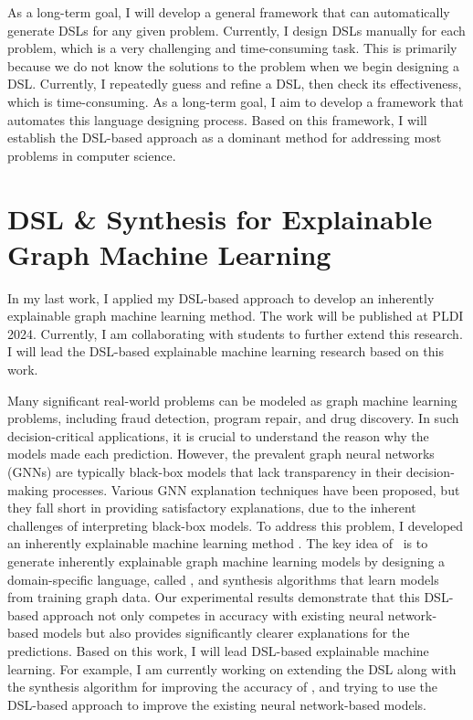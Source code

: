 \documentclass[11pt]{article}
\newcommand{\myparagraph}[1]{\medskip\noindent{\it \textbf{#1.}}}
\begin{document}
As a long-term goal, I will develop a general framework that can automatically generate DSLs for any given problem. 
%
Currently, I design DSLs manually for each problem, which is a very challenging and time-consuming task. 
%
This is primarily because we do not know the solutions to the problem when we begin designing a DSL.
%
Currently, I repeatedly guess and refine a DSL, then check its effectiveness, which is time-consuming.
%
As a long-term goal, I aim to develop a framework that automates this language designing process.
%
Based on this framework, I will establish the DSL-based approach as a dominant method for addressing most problems in computer science.



\section{DSL \& Synthesis for Explainable Graph Machine Learning}
%
In my last work, I applied my DSL-based approach to develop an inherently explainable graph machine learning method. 
%
The work will be published at PLDI 2024. 
%
Currently, I am collaborating with students to further extend this research.
%
I will lead the DSL-based explainable machine learning research based on this work.
%

\myparagraph{PL4XGL}
Many significant real-world problems can be modeled as graph machine learning problems, including fraud detection, program repair, and drug discovery.
%
In such decision-critical applications, it is crucial to understand the reason why the models made each prediction.
%
However, the prevalent graph neural networks (GNNs) are typically black-box models that lack transparency in their decision-making processes.
%
Various GNN explanation techniques have been proposed, but they fall short in providing satisfactory explanations, due to the inherent challenges of interpreting black-box models. 
%
To address this problem, I developed an inherently explainable machine learning method {\PLXGL}.
%
The key idea of \PLXGL~is to generate inherently explainable graph machine learning models by designing a domain-specific language, called \GDL, and synthesis algorithms that learn models from training graph data.
%
Our experimental results demonstrate that this DSL-based approach not only competes in accuracy with existing neural network-based models but also provides significantly clearer explanations for the predictions.
%
Based on this work, I will lead DSL-based explainable machine learning.
%
For example, I am currently working on extending the DSL along with the synthesis algorithm for improving the accuracy of {\PLXGL}, and trying to use the DSL-based approach to improve the existing neural network-based models.
\end{document}
